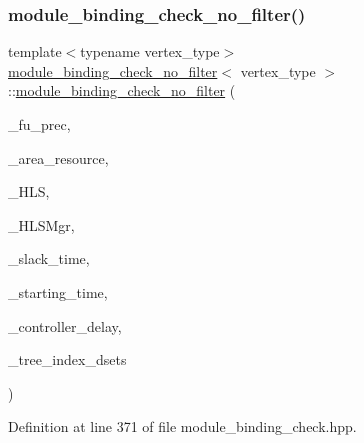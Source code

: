 \subsubsection{\texorpdfstring{module\+\_\+binding\+\_\+check\+\_\+no\+\_\+filter()}{module\_binding\_check\_no\_filter()}\hspace{0.1cm}{\footnotesize\ttfamily [1/2]}}
{\footnotesize\ttfamily template$<$typename vertex\+\_\+type$>$ \\
\hyperlink{structmodule__binding__check__no__filter}{module\+\_\+binding\+\_\+check\+\_\+no\+\_\+filter}$<$ vertex\+\_\+type $>$\+::\hyperlink{structmodule__binding__check__no__filter}{module\+\_\+binding\+\_\+check\+\_\+no\+\_\+filter} (\begin{DoxyParamCaption}\item[{unsigned int}]{\+\_\+fu\+\_\+prec,  }\item[{double}]{\+\_\+area\+\_\+resource,  }\item[{const \hyperlink{hls_8hpp_a75d0c73923d0ddfa28c4843a802c73a7}{hls\+Ref}}]{\+\_\+\+H\+LS,  }\item[{const \hyperlink{hls__manager_8hpp_acd3842b8589fe52c08fc0b2fcc813bfe}{H\+L\+S\+\_\+manager\+Ref}}]{\+\_\+\+H\+L\+S\+Mgr,  }\item[{const \hyperlink{custom__map_8hpp_ad1ed68f2ff093683ab1a33522b144adc}{Custom\+Unordered\+Map}$<$ \hyperlink{graph_8hpp_abefdcf0544e601805af44eca032cca14}{vertex}, double $>$ \&}]{\+\_\+slack\+\_\+time,  }\item[{const \hyperlink{custom__map_8hpp_ad1ed68f2ff093683ab1a33522b144adc}{Custom\+Unordered\+Map}$<$ \hyperlink{graph_8hpp_abefdcf0544e601805af44eca032cca14}{vertex}, double $>$ \&}]{\+\_\+starting\+\_\+time,  }\item[{double}]{\+\_\+controller\+\_\+delay,  }\item[{\hyperlink{classmodule__register__binding__spec}{module\+\_\+register\+\_\+binding\+\_\+spec} \&}]{\+\_\+tree\+\_\+index\+\_\+dsets }\end{DoxyParamCaption})\hspace{0.3cm}{\ttfamily [inline]}}



Definition at line 371 of file module\+\_\+binding\+\_\+check.\+hpp.

\mbox{\label{structmodule__binding__check__no__filter_abbcb52f5640574e625745906f6c03f07}} 
